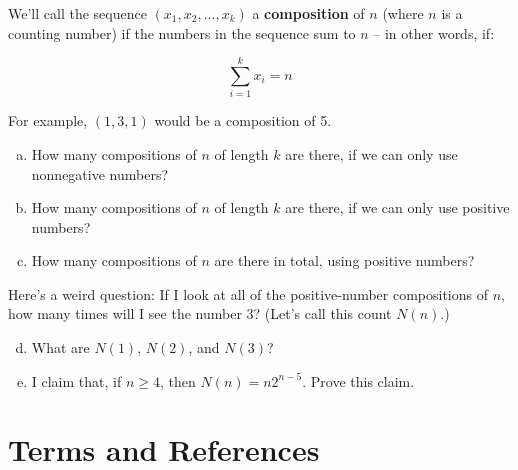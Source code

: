 % 
\begin{problem}
\label{composition-num-3s}

We'll call the sequence $(x_1, x_2, ..., x_k)$ a \textbf{composition} of $n$ (where $n$ is a counting number) if the numbers in the sequence sum to $n$ -- in other words, if:

\begin{equation*}
\sum_{i=1}^k x_i = n
\end{equation*}

For example, $(1,3,1)$ would be a composition of 5.

\begin{enumerate}[(a)]
\item How many compositions of $n$ of length $k$ are there, if we can only use nonnegative numbers? %
\item How many compositions of $n$ of length $k$ are there, if we can only use positive numbers? %
\item How many compositions of $n$ are there in total, using positive numbers? %
\end{enumerate}

Here's a weird question: If I look at all of the positive-number compositions of $n$, how many times will I see the number 3? (Let's call this count $N(n)$.)

\begin{enumerate}[(a)]
\setcounter{enumi}{3}
\item What are $N(1)$, $N(2)$, and $N(3)$?
\item I claim that, if $n \geq 4$, then $N(n) = n2^{n-5}$. Prove this claim. 
\end{enumerate}




\end{problem}


\newpage
\section{Terms and References}


